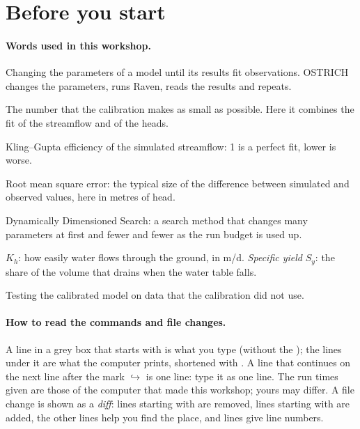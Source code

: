 \section{Before you start}
\paragraph{Words used in this workshop.}
\begin{description}[itemsep=1pt]
\item[Calibration] Changing the parameters of a model until its results fit observations. OSTRICH changes the
  parameters, runs Raven, reads the results and repeats.
\item[Objective function] The number that the calibration makes as small as possible. Here it combines the fit of the
  streamflow and of the heads.
\item[KGE] Kling--Gupta efficiency of the simulated streamflow: 1 is a perfect fit, lower is worse.
\item[RMSE] Root mean square error: the typical size of the difference between simulated and observed values, here in
  metres of head.
\item[DDS] Dynamically Dimensioned Search: a search method that changes many parameters at first and fewer and fewer as
  the run budget is used up.
\item[Hydraulic conductivity] $K_h$: how easily water flows through the ground, in m/d. \emph{Specific yield} $S_y$: the
  share of the volume that drains when the water table falls.
\item[Validation] Testing the calibrated model on data that the calibration did not use.
\end{description}

\paragraph{How to read the commands and file changes.} A line in a grey box that starts with \cmd{\$} is what you type
(without the \cmd{\$}); the lines under it are what the computer prints, shortened with . A line that continues on the next line after the mark $\hookrightarrow$ is one line: type it
as one line. The run times given are those of the computer that made this workshop; yours may differ. A file change is shown as
a \emph{diff}: lines starting with \cmd{-} are removed, lines starting with \cmd{+} are added, the other lines help you find
the place, and  lines give line numbers.
